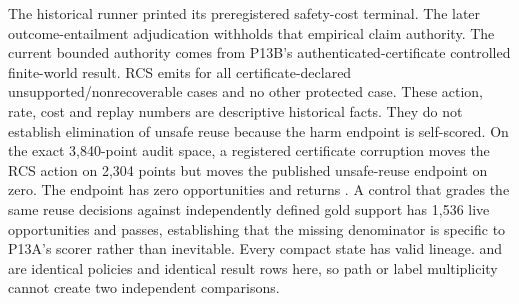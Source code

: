 \markdownRendererDocumentBegin
\markdownRendererSectionBegin
{}\markdownRendererInterblockSeparator
{}The historical runner printed its preregistered safety-cost terminal. The later outcome-entailment adjudication withholds that empirical claim authority. The current bounded authority comes from P13B's authenticated-certificate controlled finite-world result.\markdownRendererInterblockSeparator
{}\markdownRendererInterblockSeparator
{}RCS emits  for all  certificate-declared unsupported/nonrecoverable cases and no other protected case. These action, rate, cost and replay numbers are descriptive historical facts. They do not establish elimination of unsafe reuse because the harm endpoint is self-scored.\markdownRendererInterblockSeparator
{}\markdownRendererSectionBegin
{}\markdownRendererInterblockSeparator
{}On the exact 3,840-point audit space, a registered certificate corruption moves the RCS action on 2,304 points but moves the published unsafe-reuse endpoint on zero. The endpoint has zero opportunities and returns . A control that grades the same reuse decisions against independently defined gold support has 1,536 live opportunities and passes, establishing that the missing denominator is specific to P13A's scorer rather than inevitable.\markdownRendererInterblockSeparator
{}
\markdownRendererSectionEnd \markdownRendererSectionBegin
{}\markdownRendererInterblockSeparator
{}Every compact state has valid lineage.  and  are identical policies and identical result rows here, so path or label multiplicity cannot create two independent comparisons.\markdownRendererInterblockSeparator
{}
\markdownRendererSectionEnd \markdownRendererSectionBegin
